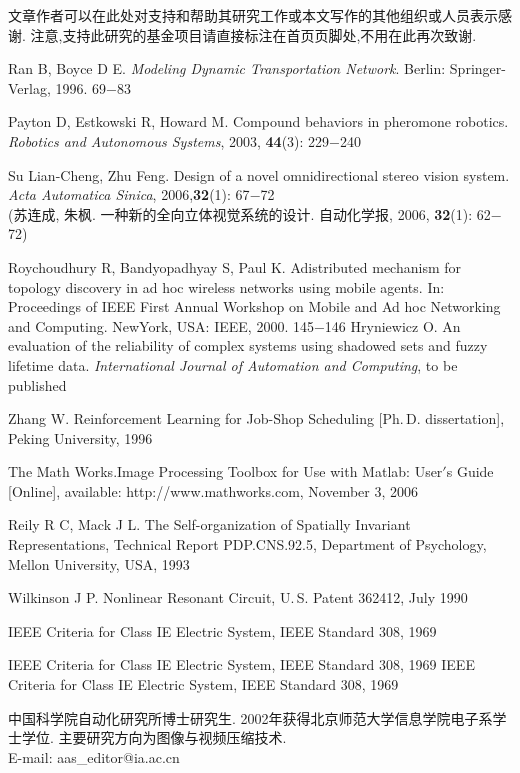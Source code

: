 \documentclass{aas}
\begin{document}
\begin{multicols}{2}
文章作者可以在此处对支持和帮助其研究工作或本文写作的其他组织或人员表示感谢.
注意,支持此研究的基金项目请直接标注在首页页脚处,不用在此再次致谢.

\begin{thebibliography}{99}
 \addtolength{\itemsep}{0.2em} 
 Ran B, Boyce D E. {\sl Modeling Dynamic Transportation Network}.
Berlin: Springer-Verlag, 1996. 69$-$83

 Payton D, Estkowski R, Howard M. Compound behaviors in pheromone robotics. {\sl Robotics and Autonomous Systems}, 2003, {\bf 44}(3): 229$-$240

 Su Lian-Cheng, Zhu Feng. Design of a novel omnidirectional stereo vision system. {\sl  Acta Automatica Sinica}, 2006,{\bf 32}(1): 67$-$72\\ (苏连成, 朱枫. 一种新的全向立体视觉系统的设计. 自动化学报, 2006, {\bf 32}(1): 62$-$72)

 Roychoudhury R, Bandyopadhyay S, Paul K. Adistributed mechanism for topology discovery in ad hoc wireless networks using mobile agents. In: Proceedings of IEEE First Annual Workshop on Mobile and Ad hoc Networking and Computing. NewYork, USA: IEEE, 2000. 145$-$146
  Hryniewicz O. An evaluation of the reliability of complex systems using shadowed sets and fuzzy lifetime data. {\sl International Journal of Automation and Computing}, to be published
 
  Zhang W. Reinforcement Learning for Job-Shop Scheduling [Ph.\,D.
dissertation], Peking University, 1996

 The Math Works.Image Processing Toolbox for Use with Matlab: User$'$s Guide [Online], available: http://www.mathworks.com, November 3, 2006

 Reily R C, Mack J L. The Self-organization of Spatially Invariant
Representations, Technical Report PDP.CNS.92.5, Department of
Psychology, Mellon University, USA, 1993

 Wilkinson J P. Nonlinear Resonant Circuit, U.\,S. Patent 362412, July 1990

 IEEE Criteria for Class IE Electric System, IEEE Standard 308, 1969

 IEEE Criteria for Class IE Electric System, IEEE Standard 308, 1969
 IEEE Criteria for Class IE Electric System, IEEE Standard 308, 1969
\end{thebibliography}

\begin{biography}
\quad
中国科学院自动化研究所博士研究生.
2002年获得北京师范大学信息学院电子系学士学位.
主要研究方向为图像与视频压缩技术.\\E-mail: aas\_editor@ia.ac.cn


\end{biography}
\end{multicols}
\end{document}
